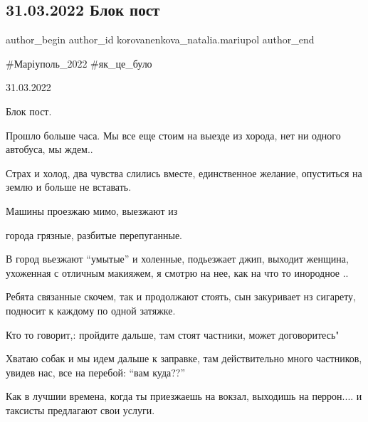  
 
 
 
 

\subsection{31.03.2022 Блок пост}
\label{sec:03_04_2023.fb.korovanenkova_natalia.mariupol.1.31_03_2022_blok_post}

\ifcmt
 author_begin
   author_id korovanenkova_natalia.mariupol
 author_end
\fi

\#Маріуполь\_2022 \#як\_це\_було

31.03.2022

Блок пост.

Прошло больше часа. Мы все еще стоим на выезде из хорода, нет ни одного
автобуса, мы ждем..

Страх и холод, два чувства слились вместе, единственное желание, опуститься на
землю и больше не вставать.

Машины проезжаю мимо, выезжают из

города грязные, разбитые перепуганные.


В город вьезжают \enquote{умытые} и холенные, подьезжает джип, выходит
женщина, ухоженная с отличным макияжем, я смотрю на нее, как на что то инородное
..

Ребята  связанные скочем, так и продолжают стоять, сын закуривает нз сигарету,
подносит к каждому  по одной затяжке.

Кто то говорит,: пройдите дальше,  там стоят частники, может договоритесь"

Хватаю собак и мы идем дальше к заправке, там действительно много частников,
увидев нас,  все на перебой: \enquote{вам куда??}

Как в лучшии времена, когда  ты приезжаешь на вокзал,   выходишь на перрон.... и
таксисты предлагают свои услуги.

